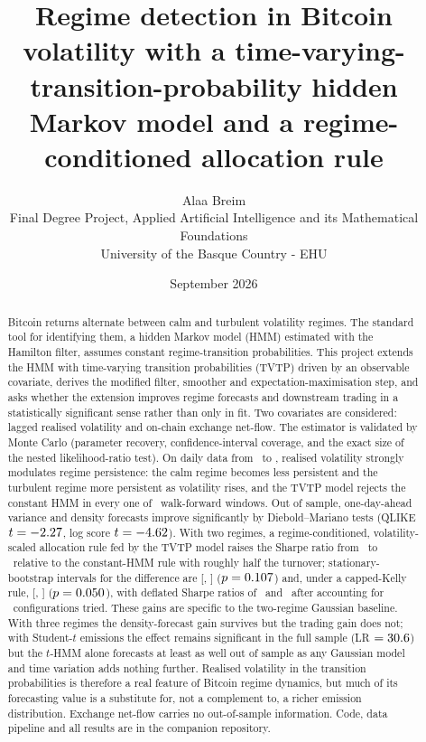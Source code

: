 \documentclass[11pt,a4paper]{article}
\title{\vspace{-1.2cm}Regime detection in Bitcoin volatility with a time-varying-transition-probability hidden Markov model and a regime-conditioned allocation rule}
\author{Alaa Breim\\[2pt]
\small Final Degree Project, Applied Artificial Intelligence and its Mathematical Foundations\\
\small University of the Basque Country - EHU
}
\date{September 2026}
\begin{document}
\maketitle
\vspace{-0.8cm}
\begin{abstract}
\noindent
Bitcoin returns alternate between calm and turbulent volatility regimes. The standard tool for identifying them, a hidden Markov model (HMM) estimated with the Hamilton filter, assumes constant regime-transition probabilities. This project extends the HMM with time-varying transition probabilities (TVTP) driven by an observable covariate, derives the modified filter, smoother and expectation-maximisation step, and asks whether the extension improves regime forecasts and downstream trading in a statistically significant sense rather than only in fit. Two covariates are considered: lagged realised volatility and on-chain exchange net-flow. The estimator is validated by Monte Carlo (parameter recovery, confidence-interval coverage, and the exact size of the nested likelihood-ratio test). On daily data from \DataStart\ to \DataEnd, realised volatility strongly modulates regime persistence: the calm regime becomes less persistent and the turbulent regime more persistent as volatility rises, and the TVTP model rejects the constant HMM in every one of \NWindows\ walk-forward windows. Out of sample, one-day-ahead variance and density forecasts improve significantly by Diebold--Mariano tests (QLIKE $t=-2.27$, log score $t=-4.62$). With two regimes, a regime-conditioned, volatility-scaled allocation rule fed by the TVTP model raises the Sharpe ratio from \SRhmm\ to \SRtvtp\ relative to the constant-HMM rule with roughly half the turnover; stationary-bootstrap intervals for the difference are [\BootLo, \BootHi] ($p=0.107$) and, under a capped-Kelly rule, [\BootLoK, \BootHiK] ($p=0.050$), with deflated Sharpe ratios of \DSR\ and \DSRK\ after accounting for \NTrials\ configurations tried. These gains are specific to the two-regime Gaussian baseline. With three regimes the density-forecast gain survives but the trading gain does not; with Student-$t$ emissions the effect remains significant in the full sample (LR $=30.6$) but the $t$-HMM alone forecasts at least as well out of sample as any Gaussian model and time variation adds nothing further. Realised volatility in the transition probabilities is therefore a real feature of Bitcoin regime dynamics, but much of its forecasting value is a substitute for, not a complement to, a richer emission distribution. Exchange net-flow carries no out-of-sample information. Code, data pipeline and all results are in the companion repository.
\end{abstract}
\end{document}
